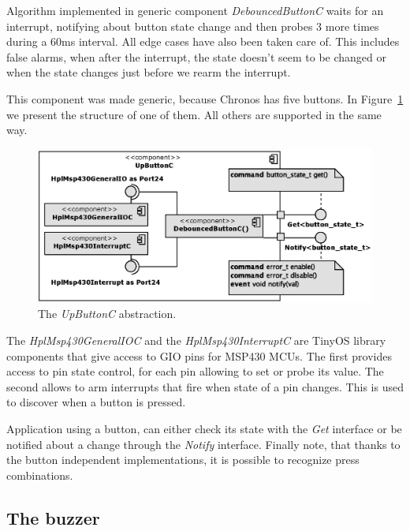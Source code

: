 Algorithm implemented in generic component \emph{DebouncedButtonC} waits for an interrupt, notifying about button state change and then probes 3 more times during a 60ms interval. All edge cases have also been taken care of. This includes false alarms, when after the interrupt, the state doesn't seem to be changed or when the state changes just before we rearm the interrupt.

This component was made generic, because Chronos has five buttons. In Figure~\ref{fig:UpButtonC} we present the structure of one of them. All others are supported in the same way.
\begin{figure}[h]
  \centering
  \includegraphics{diagrams/UpButtonC.eps}
  \caption{The \emph{UpButtonC} abstraction.}
  \label{fig:UpButtonC}
\end{figure}
The \emph{HplMsp430GeneralIOC} and the \emph{HplMsp430InterruptC} are TinyOS library components that give access to GIO pins for MSP430 MCUs. The first provides access to pin state control, for each pin allowing to set or probe its value. The second allows to arm interrupts that fire when state of a pin changes. This is used to discover when a button is pressed.

Application using a button, can either check its state with the \emph{Get} interface or be notified about a change through the \emph{Notify} interface. Finally note, that thanks to the button independent implementations, it is possible to recognize press combinations.

\subsection{The buzzer}

